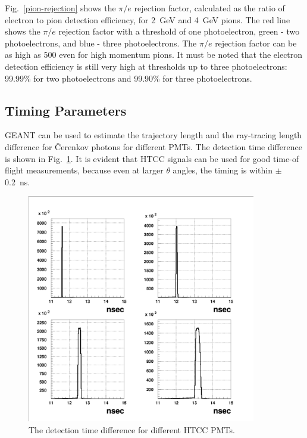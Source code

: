 Fig.~\ref{pion-rejection} shows the $\pi/e$ rejection factor, calculated as 
the ratio of electron to pion detection efficiency, for 2~GeV and 4~GeV 
pions.  The red line shows the $\pi/e$ rejection factor with a threshold 
of one photoelectron, green - two photoelectrons, and blue - three 
photoelectrons.  The $\pi/e$ rejection factor can be as high as 500 even 
for high momentum pions.  It must be noted that the electron detection 
efficiency is still very high at thresholds up to three photoelectrons: 
99.99\% for two photoelectrons and 99.90\% for three photoelectrons.

\subsection{Timing Parameters}

GEANT can be used to estimate the trajectory length and the ray-tracing 
length difference for {\v C}erenkov photons for different PMTs.  The 
detection time difference is shown in Fig.~\ref{timing}.  It is evident 
that HTCC signals can be used for good time-of flight measurements, because 
even at larger $\theta$ angles, the timing is within $\pm$0.2~ns.

\begin{figure}[htbp]
\centering
\includegraphics[height=10cm,angle=0]{MC-simulation/timing.eps}
\caption{\small{ The detection time difference for different HTCC PMTs.}}
\label{timing}
\end{figure}
